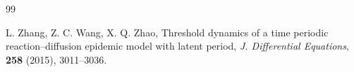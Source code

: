 \documentclass[12pt]{amsart}
\theoremstyle{remark}
\numberwithin{equation}{section}
\numberwithin{equation}{section}
\newcommand{\1}{\boldsymbol{1}}
\begin{document}
\begin{thebibliography}{99}
{ L. Zhang, Z. C. Wang, X. Q. Zhao, Threshold dynamics of a time periodic reaction–diffusion epidemic model with latent period, {\it J. Differential Equations}, {\bf 258} (2015), 3011--3036.











}
\end{thebibliography}
\end{document}
